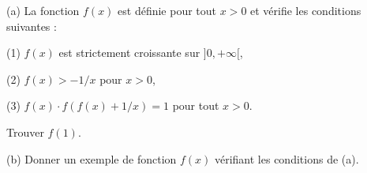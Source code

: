 (a) La fonction $f(x)$ est définie pour tout $x > 0$ et vérifie les conditions suivantes :

(1) $f(x)$ est strictement croissante sur $]0, +\infty[$,

(2) $f(x) > -1/x$ pour $x > 0$,

(3) $f(x) \cdot f(f(x) + 1/x) = 1$ pour tout $x > 0$.

Trouver $f(1)$.

(b) Donner un exemple de fonction $f(x)$ vérifiant les conditions de (a).
